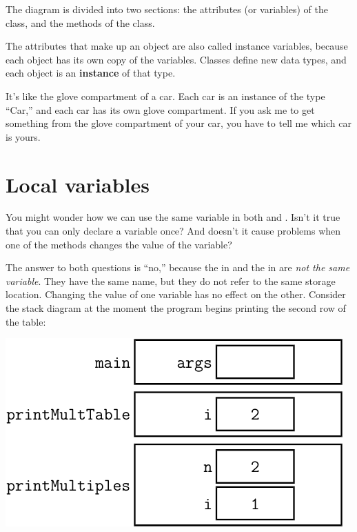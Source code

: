 The diagram is divided into two sections: the attributes (or variables) of the class, and the methods of the class.


The attributes that make up an object are also called instance variables, because each object has its own copy of the variables.
Classes define new data types, and each object is an {\bf instance} of that type.

It's like the glove compartment of a car.
Each car is an instance of the type ``Car,'' and each car has its own glove compartment.
If you ask me to get something from the glove compartment of your car, you have to tell me which car is yours.


\section{Local variables}


You might wonder how we can use the same variable  in both  and .
Isn't it true that you can only declare a variable once?
And doesn't it cause problems when one of the methods changes the value of the variable?

The answer to both questions is ``no,'' because the  in  and the  in  are {\em not the same variable}.
They have the same name, but they do not refer to the same storage location.
Changing the value of one variable has no effect on the other.
Consider the stack diagram at the moment the program begins printing the second row of the table:

\begin{center}
\vspace{1em}
\includegraphics{figs/stack4.pdf}
\vspace{1em}
\end{center}


